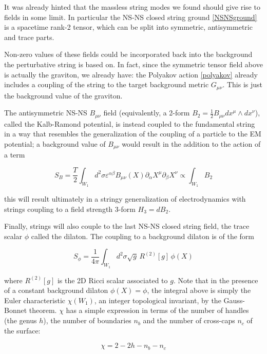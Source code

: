 It was already hinted that the massless string modes we found should give rise to fields in some limit. In particular the NS-NS closed string ground \eqref{NSNSground} is a spacetime rank-2 tensor, which can be split into symmetric, antisymmetric and trace parts.

Non-zero values of these fields could be incorporated back into the background the perturbative string is based on. In fact, since the symmetric tensor field above is actually the graviton, we already have: the Polyakov action \eqref{polyakov} already includes a coupling of the string to the target background metric $G_{\mu\nu}$. This is just the background value of the graviton.

The antisymmetric NS-NS $B_{\mu\nu}$ field (equivalently, a 2-form $B_2 = \frac{1}{2} B_{\mu\nu} dx^\mu \wedge dx^\nu$), called the Kalb-Ramond potential, is instead coupled to the fundamental string in a way that resembles the generalization of the coupling of a particle to the EM potential; a background value of $B_{\mu\nu}$ would result in the addition to the action of a term

\begin{equation}
	S_B = \frac{T}{2} \int_{W_1} d^2 \sigma \varepsilon^{\alpha\beta} B_{\mu\nu}(X) \partial_\alpha X^\mu \partial_\beta X^\nu \propto \int_{W_1} B_2
	\label{}
\end{equation}

this will result ultimately in a stringy generalization of electrodynamics with strings coupling to a field strength 3-form $H_3 = dB_2$.

Finally, strings will also couple to the last NS-NS closed string field, the trace scalar $\phi$ called the dilaton. The coupling to a background dilaton is of the form

\begin{equation}
	S_\phi = \frac{1}{4\pi} \int_{W_1} d^2 \sigma \sqrt g \, R^{(2)}[g] \, \phi(X)
	\label{}
\end{equation}

where $R^{(2)}[g]$ is the 2D Ricci scalar associated to $g$. Note that in the presence of a constant background dilaton $\phi(X) = \phi$, the integral above is simply the Euler characteristic $\chi(W_1)$, an integer topological invariant, by the Gauss-Bonnet theorem. $\chi$ has a simple expression in terms of the number of handles (the genus $h$), the number of boundaries $n_b$ and the number of cross-caps $n_c$ of the surface:

\begin{equation}
	\chi = 2 - 2h - n_b - n_c
	\label{}
\end{equation}

